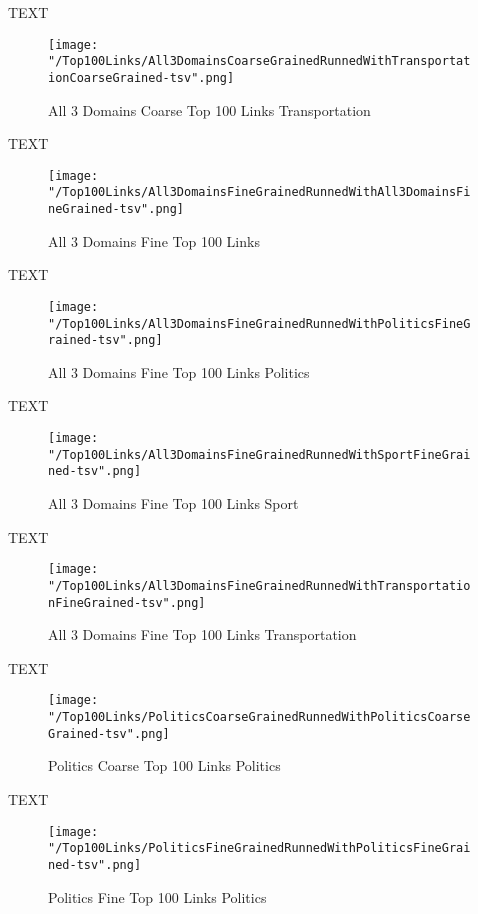 \documentclass[thesis=M,english]{FITthesis}[2018/05/30]
\begin{document}
		TEXT	

	\begin{figure}[H]\centering
		\texttt{[image: "/Top100Links/All3DomainsCoarseGrainedRunnedWithTransportationCoarseGrained-tsv".png]}
		\caption{All 3 Domains Coarse Top 100 Links Transportation}\label{}	
	\end{figure}
		
		TEXT	

	\begin{figure}[H]\centering
		\texttt{[image: "/Top100Links/All3DomainsFineGrainedRunnedWithAll3DomainsFineGrained-tsv".png]}
		\caption{All 3 Domains Fine Top 100 Links }\label{}	
	\end{figure}
	
	TEXT

	\begin{figure}[H]\centering
		\texttt{[image: "/Top100Links/All3DomainsFineGrainedRunnedWithPoliticsFineGrained-tsv".png]}
		\caption{All 3 Domains Fine Top 100 Links Politics}\label{}
	\end{figure}	

	TEXT	

	\begin{figure}[H]\centering
		\texttt{[image: "/Top100Links/All3DomainsFineGrainedRunnedWithSportFineGrained-tsv".png]}
		\caption{All 3 Domains Fine Top 100 Links Sport}\label{}
	\end{figure}
	
		TEXT	

	\begin{figure}[H]\centering
		\texttt{[image: "/Top100Links/All3DomainsFineGrainedRunnedWithTransportationFineGrained-tsv".png]}
		\caption{All 3 Domains Fine Top 100 Links Transportation}\label{}	
	\end{figure}
	
	TEXT

	\begin{figure}[H]\centering
		\texttt{[image: "/Top100Links/PoliticsCoarseGrainedRunnedWithPoliticsCoarseGrained-tsv".png]}
		\caption{Politics Coarse Top 100 Links Politics}\label{}
	\end{figure}	

	TEXT	

	\begin{figure}[H]\centering
		\texttt{[image: "/Top100Links/PoliticsFineGrainedRunnedWithPoliticsFineGrained-tsv".png]}
		\caption{Politics Fine Top 100 Links Politics}\label{}
	\end{figure}
\end{document}
